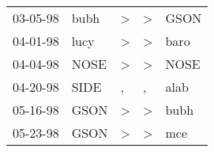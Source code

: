 \begin{supertabular}{lllll}
 03-05-98 &  bubh &  \textgreater &  \textgreater &  GSON \\
 04-01-98 &  lucy &  \textgreater &  \textgreater &  baro \\
 04-04-98 &  NOSE &  \textgreater &  \textgreater &  NOSE \\
 04-20-98 &  SIDE &             , &             , &  alab \\
 05-16-98 &  GSON &  \textgreater &  \textgreater &  bubh \\
 05-23-98 &  GSON &  \textgreater &  \textgreater &   mce \\
\end{supertabular}
